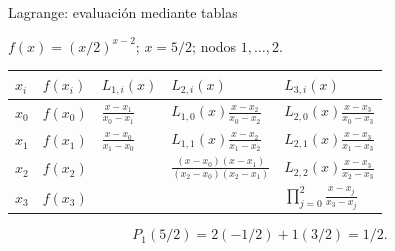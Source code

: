 \documentclass[original_version/main.tex]{subfiles}
\begin{document}
\begin{frame}[t]{Lagrange: evaluación mediante tablas}
\par\noindent\begin{minipage}[t][12mm][t]{\textwidth}\small\strut $f(x)=(x/2)^{x-2}$; $x=5/2$; nodos $1,\ldots,2$.\end{minipage}\par\nointerlineskip
\begin{minipage}[t]{\textwidth}\begingroup\scriptsize\setlength{\tabcolsep}{3pt}\begin{center}\begin{tabular}{|C{.065\textwidth}|C{.095\textwidth}|C{.19\textwidth}|C{.25\textwidth}|C{.25\textwidth}|}\hline
\rule[-2mm]{0pt}{6mm}$x_i$&$f(x_i)$&$L_{1,i}(x)$&$L_{2,i}(x)$&$L_{3,i}(x)$\\\hline
\rule[-2.5mm]{0pt}{9mm}$x_0$&$f(x_0)$&$\frac{x-x_1}{x_0-x_1}$&$L_{1,0}(x)\frac{x-x_2}{x_0-x_2}$&$L_{2,0}(x)\frac{x-x_3}{x_0-x_3}$\\\hline
\rule[-2.5mm]{0pt}{9mm}$x_1$&$f(x_1)$&$\frac{x-x_0}{x_1-x_0}$&$L_{1,1}(x)\frac{x-x_2}{x_1-x_2}$&$L_{2,1}(x)\frac{x-x_3}{x_1-x_3}$\\\hline
\rule[-2.5mm]{0pt}{9mm}$x_2$&$f(x_2)$&&$\frac{(x-x_0)(x-x_1)}{(x_2-x_0)(x_2-x_1)}$&$L_{2,2}(x)\frac{x-x_3}{x_2-x_3}$\\\hline
\rule[-2.5mm]{0pt}{9mm}$x_3$&$f(x_3)$&&&$\prod_{j=0}^2\frac{x-x_j}{x_3-x_j}$\\\hline
\end{tabular}\end{center}\endgroup\par
\end{minipage}\par\[P_1(5/2)=2(-1/2)+1(3/2)=1/2.\]
\end{frame}
\end{document}
